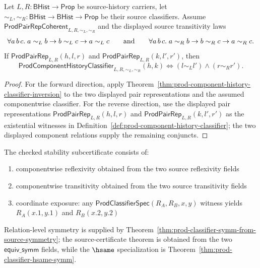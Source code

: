 \begin{theorem}
\label{thm:prod-component-history-classifier-displayed-exactness}
Let $L,R:\mathsf{BHist}\to\mathsf{Prop}$ be source-history carriers, let
$\sim_L,\sim_R:\mathsf{BHist}\to\mathsf{BHist}\to\mathsf{Prop}$ be their source
classifiers. Assume $\mathsf{ProdPairRepCoherent}_{L,R,\sim_L,\sim_R}$ and the
displayed source transitivity laws
$$
\forall a\,b\,c.\;a\sim_L b\to b\sim_L c\to a\sim_L c
\qquad\hbox{and}\qquad
\forall a\,b\,c.\;a\sim_R b\to b\sim_R c\to a\sim_R c.
$$
If
$\mathsf{ProdPairRep}_{L,R}(h,l,r)$ and
$\mathsf{ProdPairRep}_{L,R}(k,l',r')$, then
$$
\mathsf{ProdComponentHistoryClassifier}_{L,R,\sim_L,\sim_R}(h,k)
\Longleftrightarrow
(l\sim_L l')\wedge(r\sim_R r').
$$
\end{theorem}
\begin{proof}
For the forward direction, apply
Theorem~\ref{thm:prod-component-history-classifier-inversion} to the two
displayed pair representations and the assumed componentwise classifier. For
the reverse direction, use the displayed pair representations
$\mathsf{ProdPairRep}_{L,R}(h,l,r)$ and
$\mathsf{ProdPairRep}_{L,R}(k,l',r')$ as the existential witnesses in
Definition~\ref{def:prod-component-history-classifier}; the two displayed
component relations supply the remaining conjuncts.
\end{proof}

\begin{definition}
\label{def:prod-stability-certificate}
The checked stability subcertificate consists of:
\begin{enumerate}
  \item componentwise reflexivity obtained from the two source reflexivity fields
  \item componentwise transitivity obtained from the two source transitivity fields
  \item coordinate exposure: any
  $\mathsf{ProdClassifierSpec}(R_A,R_B,x,y)$ witness yields
  $R_A(x.1,y.1)$ and $R_B(x.2,y.2)$
\end{enumerate}
Relation-level symmetry is supplied by
Theorem~\ref{thm:prod-classifier-symm-from-source-symmetry}; the
source-certificate theorem is obtained from the two $\mathsf{equiv\_symm}$
fields, while the $\hsame$ specialization is
Theorem~\ref{thm:prod-classifier-hsame-symm}.
\end{definition}

